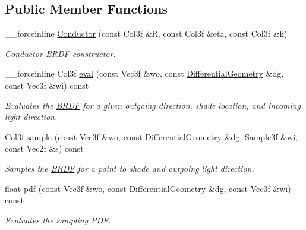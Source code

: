 \subsection*{Public Member Functions}
\begin{DoxyCompactItemize}
\item 
\_\-\_\-forceinline \hyperlink{classembree_1_1_conductor_a59717273c6cedbbfe30ac2967d54c21d}{Conductor} (const Col3f \&R, const Col3f \&eta, const Col3f \&k)
\begin{DoxyCompactList}\small\item\em \hyperlink{classembree_1_1_conductor}{Conductor} \hyperlink{classembree_1_1_b_r_d_f}{BRDF} constructor. \item\end{DoxyCompactList}\item 
\_\-\_\-forceinline Col3f \hyperlink{classembree_1_1_conductor_afb1df0df04fa63b239869a895530831f}{eval} (const Vec3f \&wo, const \hyperlink{structembree_1_1_differential_geometry}{DifferentialGeometry} \&dg, const Vec3f \&wi) const 
\begin{DoxyCompactList}\small\item\em Evaluates the \hyperlink{classembree_1_1_b_r_d_f}{BRDF} for a given outgoing direction, shade location, and incoming light direction. \item\end{DoxyCompactList}\item 
Col3f \hyperlink{classembree_1_1_conductor_ac5b0f13023ecafedbe97816939c937f8}{sample} (const Vec3f \&wo, const \hyperlink{structembree_1_1_differential_geometry}{DifferentialGeometry} \&dg, \hyperlink{structembree_1_1_sample}{Sample3f} \&wi, const Vec2f \&s) const 
\begin{DoxyCompactList}\small\item\em Samples the \hyperlink{classembree_1_1_b_r_d_f}{BRDF} for a point to shade and outgoing light direction. \item\end{DoxyCompactList}\item 
float \hyperlink{classembree_1_1_conductor_a357d9b89ca7450aa6c7972ba42c96e02}{pdf} (const Vec3f \&wo, const \hyperlink{structembree_1_1_differential_geometry}{DifferentialGeometry} \&dg, const Vec3f \&wi) const 
\begin{DoxyCompactList}\small\item\em Evaluates the sampling PDF. \item\end{DoxyCompactList}\end{DoxyCompactItemize}


